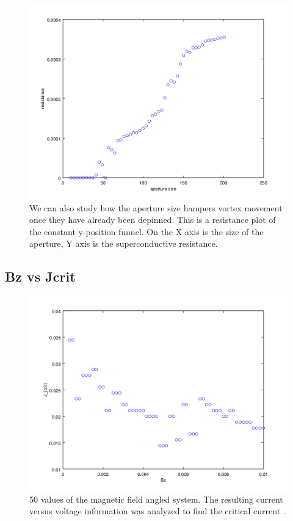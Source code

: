 \begin{figure}[htbp]
\begin{center}
\includegraphics[scale=.50]{AvR.png}
\caption{ We can also study how the aperture size hampers vortex movement once they have already been depinned. This is a resistance plot of the constant y-position funnel. On the X axis is the size of the aperture, Y axis is the superconductive resistance. }
\label{AvR}
\end{center}
\end{figure}


\subsection{Bz vs Jcrit}

\begin{figure}[htbp]
\begin{center}
\includegraphics[scale=.50]{angleBz.png}
\caption{ 50 values of the magnetic field angled system. The resulting current versus voltage information was analyzed to find the critical current .  }
\label{angleBz}
\end{center}
\end{figure}


